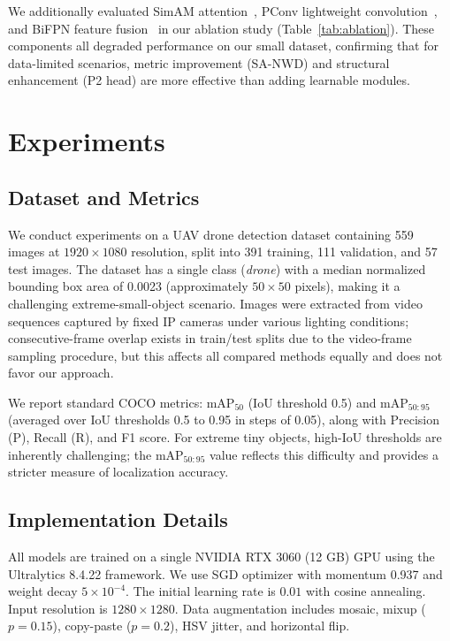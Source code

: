 \documentclass[journal]{IEEEtran}
\begin{document}
We additionally evaluated SimAM attention~\cite{yang2021simam}, PConv lightweight convolution~\cite{chen2023run}, and BiFPN feature fusion~\cite{tan2020efficientdet} in our ablation study (Table~\ref{tab:ablation}). These components all degraded performance on our small dataset, confirming that for data-limited scenarios, metric improvement (SA-NWD) and structural enhancement (P2 head) are more effective than adding learnable modules.

\section{Experiments}
\label{sec:experiments}

\subsection{Dataset and Metrics}

We conduct experiments on a UAV drone detection dataset containing 559 images at $1920 \times 1080$ resolution, split into 391 training, 111 validation, and 57 test images. The dataset has a single class (\textit{drone}) with a median normalized bounding box area of 0.0023 (approximately $50 \times 50$ pixels), making it a challenging extreme-small-object scenario. Images were extracted from video sequences captured by fixed IP cameras under various lighting conditions; consecutive-frame overlap exists in train/test splits due to the video-frame sampling procedure, but this affects all compared methods equally and does not favor our approach.

We report standard COCO metrics: mAP$_{50}$ (IoU threshold 0.5) and mAP$_{50:95}$ (averaged over IoU thresholds 0.5 to 0.95 in steps of 0.05), along with Precision (P), Recall (R), and F1 score. For extreme tiny objects, high-IoU thresholds are inherently challenging; the mAP$_{50:95}$ value reflects this difficulty and provides a stricter measure of localization accuracy.

\subsection{Implementation Details}

All models are trained on a single NVIDIA RTX 3060 (12 GB) GPU using the Ultralytics 8.4.22 framework. We use SGD optimizer with momentum 0.937 and weight decay $5\times10^{-4}$. The initial learning rate is $0.01$ with cosine annealing. Input resolution is $1280\times1280$. Data augmentation includes mosaic, mixup ($p=0.15$), copy-paste ($p=0.2$), HSV jitter, and horizontal flip.
\end{document}

